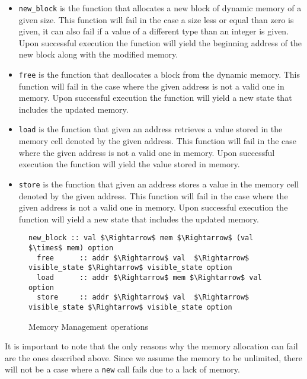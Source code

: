 \begin{itemize}
  \item{\verb|new_block| is the function that allocates a new block of dynamic memory of a given size.
  This function will fail in the case a size less or equal than zero is given, it can also fail if a value of a different type than an integer is given.
  Upon successful execution the function will yield the beginning address of the new block along with the modified memory.}
  \item{\verb|free| is the function that deallocates a block from the dynamic memory.
  This function will fail in the case where the given address is not a valid one in memory.
  Upon successful execution the function will yield a new state that includes the updated memory.}
  \item{\verb|load| is the function that given an address retrieves a value stored in the memory cell denoted by the given address.
  This function will fail in the case where the given address is not a valid one in memory.
  Upon successful execution the function will yield the value stored in memory.}
  \item{\verb|store| is the function that given an address stores a value in the memory cell denoted by the given address.
  This function will fail in the case where the given address is not a valid one in memory.
  Upon successful execution the function will yield a new state that includes the updated memory.}
\end{itemize}

\begin{figure}
  \begin{lstlisting}[mathescape=true, frame=single]
  new_block :: val $\Rightarrow$ mem $\Rightarrow$ (val $\times$ mem) option
  free      :: addr $\Rightarrow$ val  $\Rightarrow$ visible_state $\Rightarrow$ visible_state option
  load      :: addr $\Rightarrow$ mem $\Rightarrow$ val option
  store     :: addr $\Rightarrow$ val  $\Rightarrow$ visible_state $\Rightarrow$ visible_state option
  \end{lstlisting}

  \caption{Memory Management operations}
  \label{fig:mem_operations}
\end{figure}

It is important to note that the only reasons why the memory allocation can fail are the ones described above.
Since we assume the memory to be unlimited, there will not be a case where a \verb|new| call fails due to a lack of memory.


